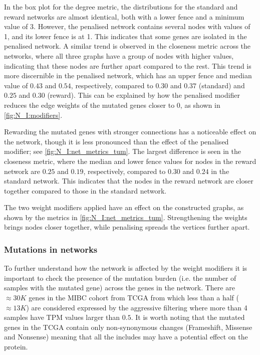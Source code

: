 In the box plot for the degree metric, the distributions for the standard and reward networks are almost identical, both with a lower fence and a minimum value of 3. However, the penalised network contains several nodes with values of 1, and its lower fence is at 1. This indicates that some genes are isolated in the penalised network. A similar trend is observed in the closeness metric across the networks, where all three graphs have a group of nodes with higher values, indicating that these nodes are further apart compared to the rest. This trend is more discernible in the penalised network, which has an upper fence and median value of $0.43$ and $0.54$, respectively, compared to $0.30$ and $0.37$ (standard) and $0.25$ and $0.30$ (reward). This can be explained by how the penalised modifier reduces the edge weights of the mutated genes closer to 0, as shown in \cref{fig:N_I:modifiers}.

Rewarding the mutated genes with stronger connections has a noticeable effect on the network, though it is less pronounced than the effect of the penalised modifier; see \cref{fig:N_I:net_metrics_tum}. The largest difference is seen in the closeness metric, where the median and lower fence values for nodes in the reward network are $0.25$ and $0.19$, respectively, compared to $0.30$ and $0.24$ in the standard network. This indicates that the nodes in the reward network are closer together compared to those in the standard network.

The two weight modifiers applied have an effect on the constructed graphs, as shown by the metrics in \cref{fig:N_I:net_metrics_tum}. Strengthening the weights brings nodes closer together, while penalising spreads the vertices further apart. 

\subsubsection*{Mutations in networks} \label{s:N_I:mut_rep}

To further understand how the network is affected by the weight modifiers it is important to check the presence of the mutation burden (i.e. the number of samples with the mutated gene) across the genes in the network. There are $\approx30K$ genes in the MIBC cohort from TCGA from which less than a half ($\approx13K$) are considered expressed by the aggressive filtering where more than 4 samples have TPM values larger than $0.5$. It is worth noting that the mutated genes in the TCGA contain only non-synonymous changes (Frameshift, Missense and Nonsense) meaning that all the includes may have a potential effect on the protein. 

